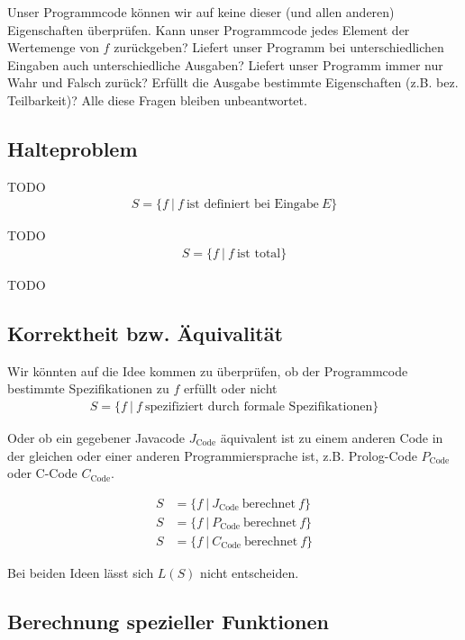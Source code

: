 \documentclass[journal]{IEEEtran}
\begin{document}
Unser Programmcode können wir auf keine dieser (und allen anderen) Eigenschaften überprüfen. Kann unser Programmcode jedes Element der Wertemenge von $f$ zurückgeben? Liefert unser Programm bei unterschiedlichen Eingaben auch unterschiedliche Ausgaben? Liefert unser Programm immer nur Wahr und Falsch zurück? Erfüllt die Ausgabe bestimmte Eigenschaften (z.B. bez. Teilbarkeit)? Alle diese Fragen bleiben unbeantwortet.

\subsection{Halteproblem}

TODO
\begin{align*}
S = \{ f \ \vert \ f \ \text{ist definiert bei Eingabe} \ E \}
\end{align*}

TODO
\begin{align*}
S = \{ f \ \vert \ f \ \text{ist total} \}
\end{align*}

TODO

\subsection{Korrektheit bzw. Äquivalität}

Wir könnten auf die Idee kommen zu überprüfen, ob der Programmcode bestimmte Spezifikationen zu $f$ erfüllt oder nicht
\begin{align*}
S = \{f \ \vert \ f \ \text{spezifiziert durch formale Spezifikationen} \}
\end{align*}

Oder ob ein gegebener Javacode $J_\mathrm{Code}$ äquivalent ist zu einem anderen Code in der gleichen oder einer anderen Programmiersprache ist, z.B. Prolog-Code $P_\mathrm{Code}$ oder C-Code $C_\mathrm{Code}$.

\begin{align*}
S &= \{f \ \vert \ J_\mathrm{Code} \ \text{berechnet} \ f \} \\
S &= \{f \ \vert \ P_\mathrm{Code} \ \text{berechnet} \ f \} \\
S &= \{f \ \vert \ C_\mathrm{Code} \ \text{berechnet} \ f \}
\end{align*}

Bei beiden Ideen lässt sich $L(S)$ nicht entscheiden.

\subsection{Berechnung spezieller Funktionen}
\end{document}
